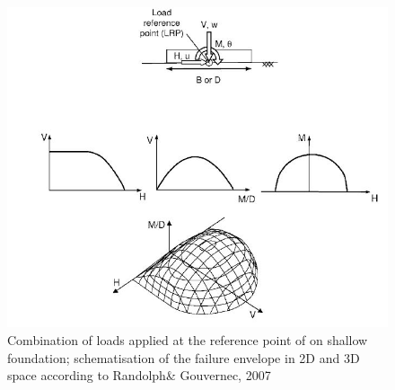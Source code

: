 \documentclass[12pt,a4paper]{report}
\begin{document}
\begin{figure}[h!]
	\centering
	\includegraphics[width=0.8\linewidth]{"failure"}
	\caption{Combination of loads applied at the reference point of on shallow foundation; schematisation of the failure envelope in 2D and 3D space according to Randolph\& Gouvernec, 2007 \cite{randolph2011offshore}} 
	\label{fail_contour}
\end{figure}
\end{document}
